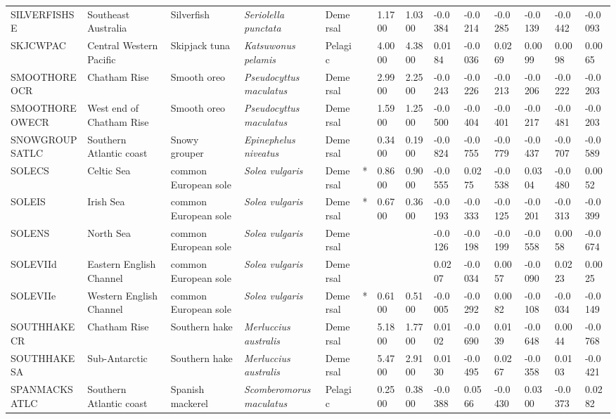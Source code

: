 \begin{longtable}{p{2.6cm}p{1.9cm}p{1.7cm}p{1.6cm}p{1cm}p{0.3cm}p{1cm}p{1cm}p{1cm}p{1.1cm}p{1cm}p{1.1cm}p{1cm}p{1.1cm}}
  SILVERFISHSE & Southeast Australia & Silverfish & \textit{Seriolella punctata} & Demersal &   & 1.1700 & 1.0300 & -0.0384 & -0.0214 & -0.0285 & -0.0139 & -0.0442 & -0.0093 \\ 
  SKJCWPAC & Central Western Pacific & Skipjack tuna & \textit{Katsuwonus pelamis} & Pelagic &   & 4.0000 & 4.3800 & 0.0184 & -0.0036 & 0.0269 & 0.0099 & 0.0098 & 0.0065 \\ 
  SMOOTHOREOCR & Chatham Rise & Smooth oreo & \textit{Pseudocyttus maculatus} & Demersal &   & 2.9900 & 2.2500 & -0.0243 & -0.0226 & -0.0213 & -0.0206 & -0.0222 & -0.0203 \\ 
  SMOOTHOREOWECR & West end of Chatham Rise & Smooth oreo & \textit{Pseudocyttus maculatus} & Demersal &   & 1.5900 & 1.2500 & -0.0500 & -0.0404 & -0.0401 & -0.0217 & -0.0481 & -0.0203 \\ 
  SNOWGROUPSATLC & Southern Atlantic coast & Snowy grouper & \textit{Epinephelus niveatus} & Demersal &   & 0.3400 & 0.1900 & -0.0824 & -0.0755 & -0.0779 & -0.0437 & -0.0707 & -0.0589 \\ 
  SOLECS & Celtic Sea & common European sole & \textit{Solea vulgaris} & Demersal & * & 0.8600 & 0.9000 & -0.0555 & 0.0275 & -0.0538 & 0.0304 & -0.0480 & 0.0052 \\ 
  SOLEIS & Irish Sea & common European sole & \textit{Solea vulgaris} & Demersal & * & 0.6700 & 0.3600 & -0.0193 & -0.0333 & -0.0125 & -0.0201 & -0.0313 & -0.0399 \\ 
  SOLENS & North Sea & common European sole & \textit{Solea vulgaris} & Demersal &  &  &  & -0.0126 & -0.0198 & -0.0199 & -0.0558 & 0.0058 & -0.0674 \\ 
  SOLEVIId & Eastern English Channel & common European sole & \textit{Solea vulgaris} & Demersal &  &  &  & 0.0207 & -0.0034 & 0.0057 & -0.0090 & 0.0223 & 0.0025 \\ 
  SOLEVIIe & Western English Channel & common European sole & \textit{Solea vulgaris} & Demersal & * & 0.6100 & 0.5100 & -0.0005 & -0.0292 & 0.0082 & -0.0108 & -0.0034 & -0.0149 \\ 
  SOUTHHAKECR & Chatham Rise & Southern hake & \textit{Merluccius australis} & Demersal &   & 5.1800 & 1.7700 & 0.0102 & -0.0690 & 0.0139 & -0.0648 & 0.0044 & -0.0768 \\ 
  SOUTHHAKESA & Sub-Antarctic & Southern hake & \textit{Merluccius australis} & Demersal &   & 5.4700 & 2.9100 & 0.0130 & -0.0495 & 0.0267 & -0.0358 & 0.0103 & -0.0421 \\ 
  SPANMACKSATLC & Southern Atlantic coast & Spanish mackerel & \textit{Scomberomorus maculatus} & Pelagic &   & 0.2500 & 0.3800 & -0.0388 & 0.0566 & -0.0430 & 0.0300 & -0.0373 & 0.0282 \\ 

\end{longtable}
